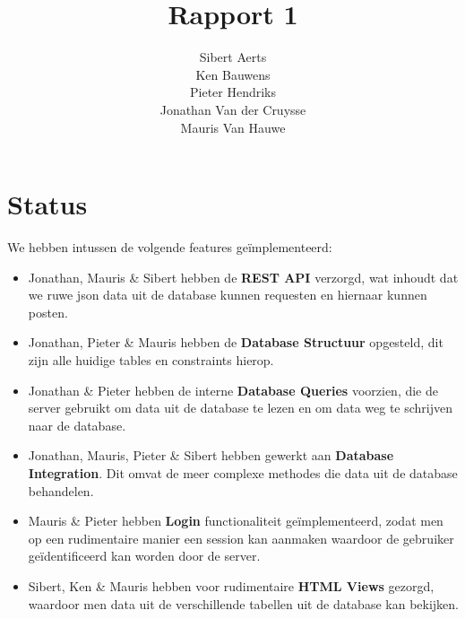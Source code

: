 \documentclass[12pt,a4paper]{article}
\begin{document}
\title{Rapport 1}
\author{Sibert Aerts \\ Ken Bauwens \\ Pieter Hendriks \\ Jonathan Van der Cruysse \\ Mauris Van Hauwe}
\maketitle

\newcommand{\code}[1]{\texttt{#1}}
\newcommand{\CS}{{C\nolinebreak[4]\hspace{-.05em}\raisebox{.4ex}{\relsize{-2}{\textbf{\#}}}}}
\lstset{language=[Sharp]C,basicstyle=\ttfamily}


\section{Status}

We hebben intussen de volgende features ge\"implementeerd:

\begin{itemize}

\item Jonathan, Mauris \& Sibert hebben de \textbf{REST API} verzorgd, wat inhoudt dat we ruwe json data uit de database kunnen requesten en hiernaar kunnen posten.

\item Jonathan, Pieter \& Mauris hebben de \textbf{Database Structuur} opgesteld, dit zijn alle huidige tables en constraints hierop.

\item Jonathan \& Pieter hebben de interne \textbf{Database Queries} voorzien, die de server gebruikt om data uit de database te lezen en om data weg te schrijven naar de database.

\item Jonathan, Mauris, Pieter \& Sibert hebben gewerkt aan \textbf{Database Integration}. Dit omvat de meer complexe methodes die data uit de database behandelen.

\item Mauris \& Pieter hebben \textbf{Login} functionaliteit ge\"implementeerd, zodat men op een rudimentaire manier een session kan aanmaken waardoor de gebruiker ge\"identificeerd kan worden door de server. 

\item Sibert, Ken \& Mauris hebben voor rudimentaire \textbf{HTML Views} gezorgd, waardoor men data uit de verschillende tabellen uit de database kan bekijken.

\end{itemize}
\end{document}
